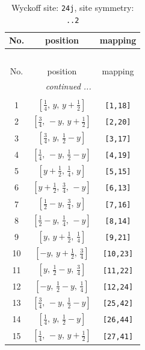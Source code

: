 \documentclass[fleqn,8pt]{jsarticle}
\begin{document}
\renewcommand{\arraystretch}{1.2}
\begin{longtable}{ccc}
\caption{Wyckoff site: {\tt 24j}, site symmetry: {\tt ..2}}
 \\
 \hline \hline
No. & position & mapping \\ \hline \endfirsthead

\multicolumn{2}{l}{\tablename\ \thetable{}} \\
 \hline \hline
No. & position & mapping \\ \hline \endhead

 \hline \hline
\multicolumn{2}{r}{\footnotesize\it continued ...} \\ \endfoot

 \hline \hline
\multicolumn{2}{r}{} \\ \endlastfoot

1 & $\left[ \frac{1}{4},\, y,\, y + \frac{1}{2} \right]$ & {\tt [1,18]} \\ \hline
2 & $\left[ \frac{3}{4},\, - y,\, y + \frac{1}{2} \right]$ & {\tt [2,20]} \\ \hline
3 & $\left[ \frac{3}{4},\, y,\, \frac{1}{2} - y \right]$ & {\tt [3,17]} \\ \hline
4 & $\left[ \frac{1}{4},\, - y,\, \frac{1}{2} - y \right]$ & {\tt [4,19]} \\ \hline
5 & $\left[ y + \frac{1}{2},\, \frac{1}{4},\, y \right]$ & {\tt [5,15]} \\ \hline
6 & $\left[ y + \frac{1}{2},\, \frac{3}{4},\, - y \right]$ & {\tt [6,13]} \\ \hline
7 & $\left[ \frac{1}{2} - y,\, \frac{3}{4},\, y \right]$ & {\tt [7,16]} \\ \hline
8 & $\left[ \frac{1}{2} - y,\, \frac{1}{4},\, - y \right]$ & {\tt [8,14]} \\ \hline
9 & $\left[ y,\, y + \frac{1}{2},\, \frac{1}{4} \right]$ & {\tt [9,21]} \\ \hline
10 & $\left[ - y,\, y + \frac{1}{2},\, \frac{3}{4} \right]$ & {\tt [10,23]} \\ \hline
11 & $\left[ y,\, \frac{1}{2} - y,\, \frac{3}{4} \right]$ & {\tt [11,22]} \\ \hline
12 & $\left[ - y,\, \frac{1}{2} - y,\, \frac{1}{4} \right]$ & {\tt [12,24]} \\ \hline
13 & $\left[ \frac{3}{4},\, - y,\, \frac{1}{2} - y \right]$ & {\tt [25,42]} \\ \hline
14 & $\left[ \frac{1}{4},\, y,\, \frac{1}{2} - y \right]$ & {\tt [26,44]} \\ \hline
15 & $\left[ \frac{1}{4},\, - y,\, y + \frac{1}{2} \right]$ & {\tt [27,41]} \\ \hline

\end{longtable}
\end{document}
